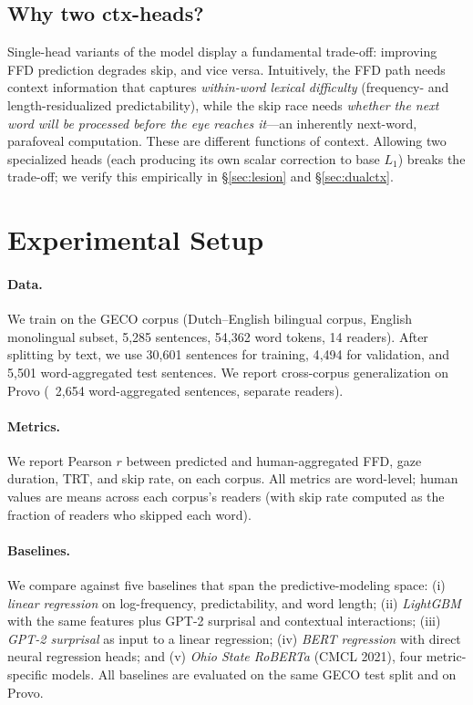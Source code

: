 \documentclass[11pt]{article}
\begin{document}
\subsection{Why two ctx-heads?}\label{sec:dualctx-rationale}

Single-head variants of the model display a fundamental trade-off: improving FFD prediction degrades skip, and vice versa. Intuitively, the FFD path needs context information that captures \emph{within-word lexical difficulty} (frequency- and length-residualized predictability), while the skip race needs \emph{whether the next word will be processed before the eye reaches it}---an inherently next-word, parafoveal computation. These are different functions of context. Allowing two specialized heads (each producing its own scalar correction to base $L_1$) breaks the trade-off; we verify this empirically in \S\ref{sec:lesion} and \S\ref{sec:dualctx}.

\section{Experimental Setup}\label{sec:setup}

\paragraph{Data.} We train on the GECO corpus \citep{cop2017geco} (Dutch--English bilingual corpus, English monolingual subset, 5{,}285 sentences, 54{,}362 word tokens, 14 readers). After splitting by text, we use 30{,}601 sentences for training, 4{,}494 for validation, and 5{,}501 word-aggregated test sentences. We report cross-corpus generalization on Provo \citep{luke2018provo} (~2{,}654 word-aggregated sentences, separate readers).

\paragraph{Metrics.} We report Pearson $r$ between predicted and human-aggregated FFD, gaze duration, TRT, and skip rate, on each corpus. All metrics are word-level; human values are means across each corpus's readers (with skip rate computed as the fraction of readers who skipped each word).

\paragraph{Baselines.} We compare against five baselines that span the predictive-modeling space: (i) \emph{linear regression} on log-frequency, predictability, and word length; (ii) \emph{LightGBM} with the same features plus GPT-2 surprisal and contextual interactions; (iii) \emph{GPT-2 surprisal} as input to a linear regression; (iv) \emph{BERT regression} \citep{devlin2019bert} with direct neural regression heads; and (v) \emph{Ohio State RoBERTa} \citep{liu2019roberta,oh2021ohiostate} (CMCL 2021), four metric-specific models. All baselines are evaluated on the same GECO test split and on Provo.
\end{document}

